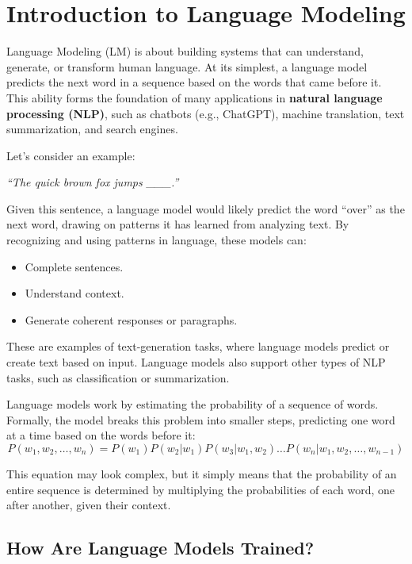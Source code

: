 \section{Introduction to Language Modeling}
\begin{flushleft}
\large Language Modeling (LM) is about building systems that can understand, generate, or transform human language. At its simplest, a language model predicts the next word in a sequence based on the words that came before it. This ability forms the foundation of many applications in \textbf{natural language processing (NLP)}, such as chatbots (e.g., ChatGPT), machine translation, text summarization, and search engines. \break

Let’s consider an example:

\begin{center}
    \textit{``The quick brown fox jumps \_\_\_.''}
\end{center}

Given this sentence, a language model would likely predict the word “over” as the next word, drawing on patterns it has learned from analyzing text. By recognizing and using patterns in language, these models can:
\begin{itemize}
    \item Complete sentences.
    \item Understand context.
    \item Generate coherent responses or paragraphs.
\end{itemize}

These are examples of text-generation tasks, where language models predict or create text based on input. Language models also support other types of NLP tasks, such as classification or summarization. \break

Language models work by estimating the probability of a sequence of words. Formally, the model breaks this problem into smaller steps, predicting one word at a time based on the words before it:
\[
P(w_1, w_2, \dots, w_n) = P(w_1)P(w_2|w_1)P(w_3|w_1, w_2)\dots P(w_n|w_1, w_2, \dots, w_{n-1})
\]

This equation may look complex, but it simply means that the probability of an entire sequence is determined by multiplying the probabilities of each word, one after another, given their context.
\end{flushleft}


\subsection{How Are Language Models Trained?}


